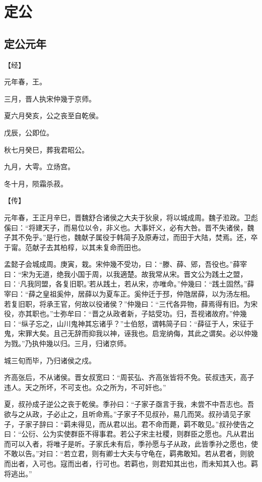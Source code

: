 \documentclass[a4paper,12pt,UTF8,twoside]{ctexbook}
\begin{document}
\chapter{定公}

\section{定公元年}



【经】

元年春，王。

三月，晋人执宋仲幾于京师。

夏六月癸亥，公之丧至自乾侯。

戊辰，公即位。

秋七月癸巳，葬我君昭公。

九月，大雩。立炀宫。

冬十月，陨霜杀菽。

【传】

元年春，王正月辛巳，晋魏舒合诸侯之大夫于狄泉，将以城成周。魏子涖政。卫彪傒曰：“将建天子，而易位以令，非义也。大事奸义，必有大咎。晋不失诸侯，魏子其不免乎。”是行也，魏献子属役于韩简子及原寿过，而田于大陆，焚焉。还，卒于甯。范献子去其柏椁，以其未复命而田也。

孟懿子会城成周。庚寅，栽。宋仲幾不受功，曰：“滕、薛、郳，吾役也。”薛宰曰：“宋为无道，绝我小国于周，以我適楚。故我常从宋。晋文公为践土之盟，曰：‘凡我同盟，各复旧职。’若从践土，若从宋，亦唯命。”仲幾曰：“践土固然。”薛宰曰：“薛之皇祖奚仲，居薛以为夏车正。奚仲迁于邳，仲虺居薛，以为汤左相。若复旧职，将承王官，何故以役诸侯？”仲幾曰：“三代各异物，薛焉得有旧。为宋役，亦其职也。”士弥牟曰：“晋之从政者新，子姑受功。归，吾视诸故府。”仲幾曰：“纵子忘之，山川鬼神其忘诸乎？”士伯怒，谓韩简子曰：“薛征于人，宋征于鬼，宋罪大矣。且己无辞而抑我以神，诬我也。启宠纳侮，其此之谓矣。必以仲幾为戮。”乃执仲幾以归。三月，归诸京师。

城三旬而毕，乃归诸侯之戍。

齐高张后，不从诸侯。晋女叔宽曰：“周苌弘、齐高张皆将不免。苌叔违天，高子违人。天之所坏，不可支也。众之所为，不可奸也。”

夏，叔孙成子逆公之丧于乾侯。季孙曰：“子家子亟言于我，未尝不中吾志也。吾欲与之从政，子必止之，且听命焉。”子家子不见叔孙，易几而哭。叔孙请见子家子，子家子辞曰：“羁未得见，而从君以出。君不命而薨，羁不敢见。”叔孙使告之曰：“公衍、公为实使群臣不得事君。若公子宋主社稷，则群臣之愿也。凡从君出而可以入者，将唯子是听。子家氏未有后，季孙愿与子从政，此皆季孙之愿也，使不敢以告。”对曰：“若立君，则有卿士大夫与守龟在，羁弗敢知。若从君者，则貌而出者，入可也。寇而出者，行可也。若羁也，则君知其出也，而未知其入也。羁将逃出。”
\end{document}
